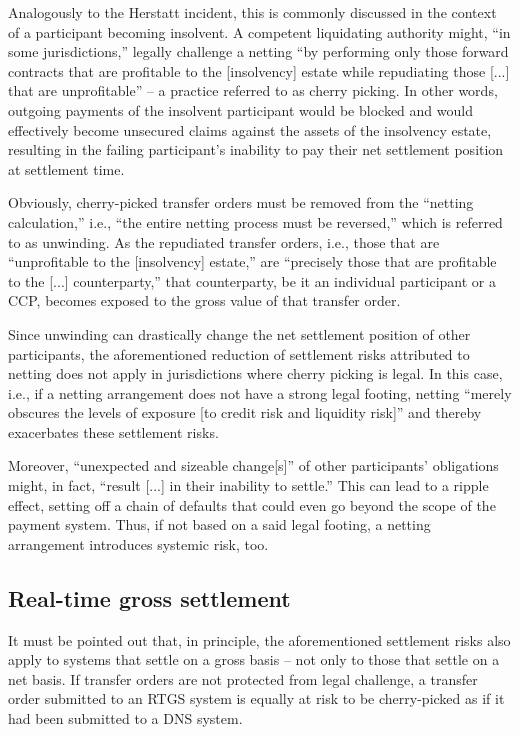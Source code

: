 Analogously to the Herstatt incident, this is commonly discussed in the context of a participant becoming insolvent.
A competent liquidating authority might, ``in some jurisdictions,'' legally challenge a netting ``by performing only those forward contracts that are profitable to the [insolvency] estate while repudiating those [...] that are unprofitable'' -- a practice referred to as cherry picking. \autocite[8]{cpmi1990}
In other words, outgoing payments of the insolvent participant would be blocked and would effectively become unsecured claims against the assets of the insolvency estate, resulting in the failing participant's inability to pay their net settlement position at settlement time.

Obviously, cherry-picked transfer orders must be removed from the ``netting calculation,'' i.e., ``the entire netting process must be reversed,'' which is referred to as unwinding. \autocite[41]{vereecken2003}
As the repudiated transfer orders, i.e., those that are ``unprofitable to the [insolvency] estate,'' are ``precisely those that are profitable to the [...] counterparty,'' that counterparty, be it an individual participant or a CCP, becomes exposed to the gross value of that transfer order. \autocite[8]{cpmi1990}

Since unwinding can drastically change the net settlement position of other participants, the aforementioned reduction of settlement risks attributed to netting does not apply in jurisdictions where cherry picking is legal.
In this case, i.e., if a netting arrangement does not have a strong legal footing, netting ``merely obscures the levels of exposure [to credit risk and liquidity risk]'' \autocite[40]{vereecken2003} and thereby exacerbates these settlement risks.

Moreover, ``unexpected and sizeable change[s]'' of other participants' obligations might, in fact, ``result [...] in their inability to settle.'' \autocite[41]{vereecken2003}
This can lead to a ripple effect, setting off a chain of defaults that could even go beyond the scope of the payment system.
Thus, if not based on a said legal footing, a netting arrangement introduces systemic risk, too.

\subsection{Real-time gross settlement}

It must be pointed out that, in principle, the aforementioned settlement risks also apply to systems that settle on a gross basis -- not only to those that settle on a net basis.
If transfer orders are not protected from legal challenge, a transfer order submitted to an RTGS system is equally at risk to be cherry-picked as if it had been submitted to a DNS system.

